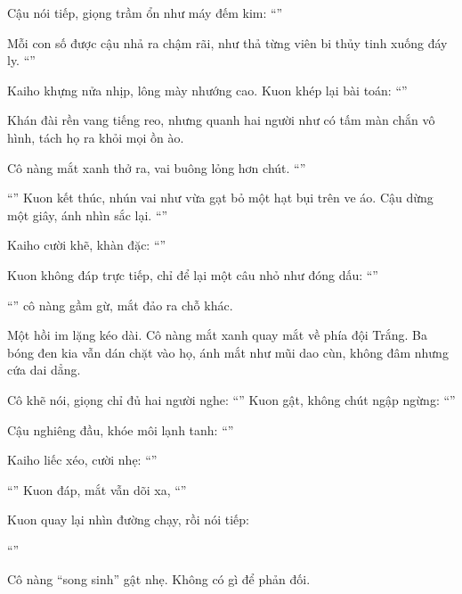 \documentclass[../main.tex]{subfiles}
\begin{document}
Cậu nói tiếp, giọng trầm ổn như máy đếm kim: ``''

Mỗi con số được cậu nhả ra chậm rãi, như thả từng viên bi thủy tinh xuống đáy ly. ``''

Kaiho khựng nửa nhịp, lông mày nhướng cao. Kuon khép lại bài toán:  ``''

Khán đài rền vang tiếng reo, nhưng quanh hai người như có tấm màn chắn vô hình, tách họ ra khỏi mọi ồn ào.

Cô nàng mắt xanh thở ra, vai buông lỏng hơn chút. ``''

``'' Kuon kết thúc, nhún vai như vừa gạt bỏ một hạt bụi trên ve áo. Cậu dừng một giây, ánh nhìn sắc lại. ``''

Kaiho cười khẽ, khàn đặc: ``''

Kuon không đáp trực tiếp, chỉ để lại một câu nhỏ như đóng dấu: ``''

``'' cô nàng gầm gừ, mắt đảo ra chỗ khác.

Một hồi im lặng kéo dài. Cô nàng mắt xanh quay mắt về phía đội Trắng. Ba bóng đen kia vẫn dán chặt vào họ, ánh mắt như mũi dao cùn, không đâm nhưng cứa dai dẳng.

Cô khẽ nói, giọng chỉ đủ hai người nghe: ``'' Kuon gật, không chút ngập ngừng: ``''

Cậu nghiêng đầu, khóe môi lạnh tanh: ``''

Kaiho liếc xéo, cười nhẹ:  ``''

``'' Kuon đáp, mắt vẫn dõi xa, ``''

Kuon quay lại nhìn đường chạy, rồi nói tiếp:

``''

Cô nàng ``song sinh'' gật nhẹ. Không có gì để phản đối.
\end{document}
